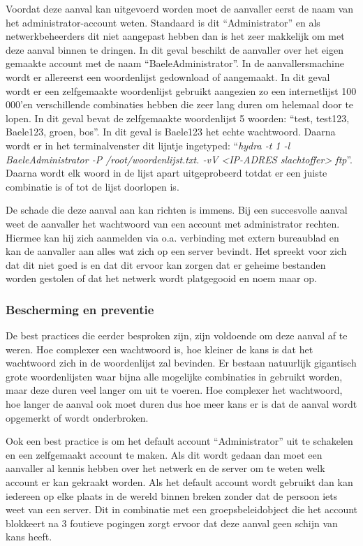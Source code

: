 \documentclass[pdftex,a4paper,12pt]{report}
\begin{document}
Voordat deze aanval kan uitgevoerd worden moet de aanvaller eerst de naam van het administrator-account weten. Standaard is dit "`Administrator"' en als netwerkbeheerders dit niet aangepast hebben dan is het zeer makkelijk om met deze aanval binnen te dringen. In dit geval beschikt de aanvaller over het eigen gemaakte account met de naam "`BaeleAdministrator"'. In de aanvallersmachine wordt er allereerst een woordenlijst gedownload of aangemaakt. In dit geval wordt er een zelfgemaakte woordenlijst gebruikt aangezien zo een internetlijst 100 000'en verschillende combinaties hebben die zeer lang duren om helemaal door te lopen. In dit geval bevat de zelfgemaakte woordenlijst 5 woorden: "`test, test123, Baele123, groen, bos"'. In dit geval is Baele123 het echte wachtwoord. Daarna wordt er in het terminalvenster dit lijntje ingetyped: "`\textit{hydra -t 1 -l BaeleAdministrator -P /root/woordenlijst.txt. -vV <IP-ADRES slachtoffer> ftp}"'. Daarna wordt elk woord in de lijst apart uitgeprobeerd totdat er een juiste combinatie is of tot de lijst doorlopen is. \newline 

De schade die deze aanval aan kan richten is immens. Bij een succesvolle aanval weet de aanvaller het wachtwoord van een account met administrator rechten. Hiermee kan hij zich aanmelden via o.a. verbinding met extern bureaublad en kan de aanvaller aan alles wat zich op een server bevindt. Het spreekt voor zich dat dit niet goed is en dat dit ervoor kan zorgen dat er geheime bestanden worden gestolen of dat het netwerk wordt platgegooid en noem maar op.

\subsubsection{Bescherming en preventie}
De best practices die eerder besproken zijn, zijn voldoende om deze aanval af te weren. Hoe complexer een wachtwoord is, hoe kleiner de kans is dat het wachtwoord zich in de woordenlijst zal bevinden. Er bestaan natuurlijk gigantisch grote woordenlijsten waar bijna alle mogelijke combinaties in gebruikt worden, maar deze duren veel langer om uit te voeren. Hoe complexer het wachtwoord, hoe langer de aanval ook moet duren dus hoe meer kans er is dat de aanval wordt opgemerkt of wordt onderbroken. \newline 

Ook een best practice is om het default account "`Administrator"' uit te schakelen en een zelfgemaakt account te maken. Als dit wordt gedaan dan moet een aanvaller al kennis hebben over het netwerk en de server om te weten welk account er kan gekraakt worden. Als het default account wordt gebruikt dan kan iedereen op elke plaats in de wereld binnen breken zonder dat de persoon iets weet van een server. Dit in combinatie met een groepsbeleidobject die het account blokkeert na 3 foutieve pogingen zorgt ervoor dat deze aanval geen schijn van kans heeft.
\end{document}
